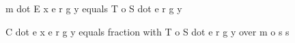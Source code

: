 m dot E x e r g y equals T o S dot e r g y

C dot e x e r g y equals fraction with T o S dot e r g y over m o s s